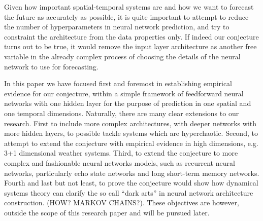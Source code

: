 \documentclass[journal]{IEEEtran}
\begin{document}
Given how important spatial-temporal systems are \cite{Wikle:2015:MPS:3160227.3160234} and how we want to forecast the future as accurately as possible, it is quite 
important to attempt to reduce the number of hyperparameters in neural network prediction, and try to constraint the architecture from 
the data properties only. If indeed our conjecture turns out to be true, it would remove the input layer architecture as another free 
variable in the already complex process of choosing the details of the neural network to use for forecasting.

In this paper we have focused first and foremost in establishing empirical evidence for our conjecture, within a simple framework of 
feedforward neural networks with one hidden layer for the purpose of prediction in one spatial and one temporal dimensions. Naturally, 
there are many clear extensions to our research. First to include more complex architectures, with deeper networks with more hidden 
layers, to possible tackle systems which are hyperchaotic. Second, to attempt to extend the conjecture with empirical evidence in high 
dimensions, e.g. 3+1 dimensional weather systems. Third, to extend the conjecture to more complex and fashionable
neural networks models, such as recurrent neural networks, particularly echo state networks and long short-term memory networks.
 Fourth and last but not least, to prove the conjecture would show how dynamical systems theory can clarify the so call
 ``dark arts'' in neural network architecture construction. (HOW? MARKOV CHAINS?). These objectives are however, outside the scope
 of this research paper and will be pursued later.


%
\end{document}
